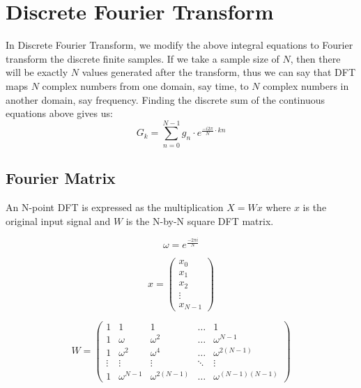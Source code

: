 \documentclass[paper=a4, fontsize=11pt]{scrartcl}
\numberwithin{equation}{section}		%
\numberwithin{figure}{section}			%
\numberwithin{table}{section}				%
\begin{document}
\section{Discrete Fourier Transform}
In Discrete Fourier Transform, we modify the above integral equations to Fourier transform the discrete finite samples. If we take a sample size of $N$, then there will be exactly $N$ values generated after the transform, thus we can say that DFT maps $N$ complex numbers from one domain, say time, to $N$ complex numbers in another domain, say frequency. Finding the discrete sum of the continuous equations above gives us:
\begin{equation} 
    G_k = \sum_{n=0}^{N-1} g_n \cdot e^{ \frac{-i2\pi}{N} \cdot kn }
\end{equation}

\vspace{5mm}

\subsection{Fourier Matrix}

An N-point DFT is expressed as the multiplication $X=Wx$ where $x$ is the original input signal and $W$ is the N-by-N square DFT matrix.

\begin{equation}
    \omega = e^{\frac{-2\pi i}{N}} 
\end{equation}


\begin{equation}   
  x
  = \left( \begin{array}{c}
        x_0 \\
        x_1 \\
        x_2 \\
        \vdots\\
        x_{N-1} 
    \end{array} \right) 
\end{equation}

\vspace{5mm}

\begin{equation}   
  W = \left( \begin{array}{ccccc}
        1 &  1 & 1 & \ldots & 1 \\
        1 & \omega & \omega^2 & \ldots & \omega^{N-1} \\
        1 & \omega^2 & \omega^4 & \ldots & \omega^{2(N-1)} \\
        \vdots&\vdots&\vdots& \ddots &\vdots\\
        1 & \omega^{N-1} & \omega^{2(N-1)} & \ldots & \omega^{(N-1)(N-1)} 
    \end{array} \right) 
\end{equation}
\end{document}
